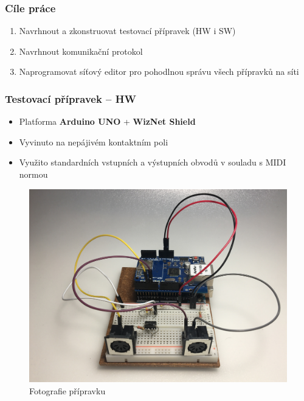 \documentclass[%
  12pt,       				%
	t,                  %
	aspectratio=1610,   %
	unicode,						%
]{beamer}				    	%
\begin{document}
\disablenavigationsymbols

\maketitle

\newcommand{\bytes}[4]{
    \begin{center}
        \large{\texttt{0x#1, 0x#2, 0x#3, 0x#4}}
    \end{center}
}

\begin{frame} 
	\frametitle{Cíle práce}
	\begin{enumerate}
		\item Navrhnout a zkonstruovat testovací přípravek (HW i SW)
		\item Navrhnout komunikační protokol
		\item Naprogramovat síťový editor pro pohodlnou správu všech přípravků na síti
	\end{enumerate}
\end{frame}

\begin{frame}
	\frametitle{Testovací přípravek -- HW}
	\begin{itemize}
		\item Platforma \textbf{Arduino UNO} + \textbf{WizNet Shield}
		\item Vyvinuto na nepájivém kontaktním poli
		\item Využito standardních vstupních a výstupních obvodů v souladu s MIDI normou
	\end{itemize}
	\begin{figure}
		\centering
		\includegraphics[height=0.4\textheight ]{obrazky/Pripravek.jpg}
		\caption{Fotografie přípravku}
	\end{figure}
\end{frame}
\end{document}
